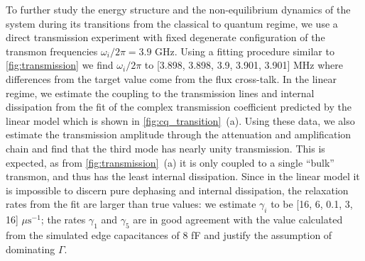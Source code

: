 \documentclass[%
 aps, pra,
 amsmath,amssymb,
 reprint,%
superscriptaddress
]{revtex4-2}
\begin{document}
To further study the energy structure and the non-equilibrium dynamics of the system during its transitions from the classical to quantum regime, we use a direct transmission experiment with fixed degenerate configuration of the transmon frequencies $\omega_i/2\pi = 3.9$ GHz. Using a fitting procedure similar to \autoref{fig:transmission} we find $\omega_i/2\pi$ to [3.898, 3.898, 3.9, 3.901, 3.901] MHz where differences from the target value come from the flux cross-talk. In the linear regime, we estimate the coupling to the transmission lines and internal dissipation from the fit of the complex transmission coefficient predicted by the linear model which is shown in \autoref{fig:cq_transition}~(a). Using these data, we also estimate the transmission amplitude through the attenuation and amplification chain and find that the third mode has nearly unity transmission. This is expected, as from \autoref{fig:transmission}~(a) it is only coupled to a single ``bulk'' transmon, and thus has the least internal dissipation. Since in the linear model it is impossible to discern pure dephasing and internal dissipation, the relaxation rates from the fit are larger than true values: we estimate $\gamma_i$ to be [16, 6, 0.1,  3, 16] $\mu\text{s}^{-1}$; the rates $\gamma_1$ and $\gamma_5$ are in good agreement with the value calculated from the simulated edge capacitances of 8 fF and justify the assumption of dominating $\Gamma$.
\end{document}
